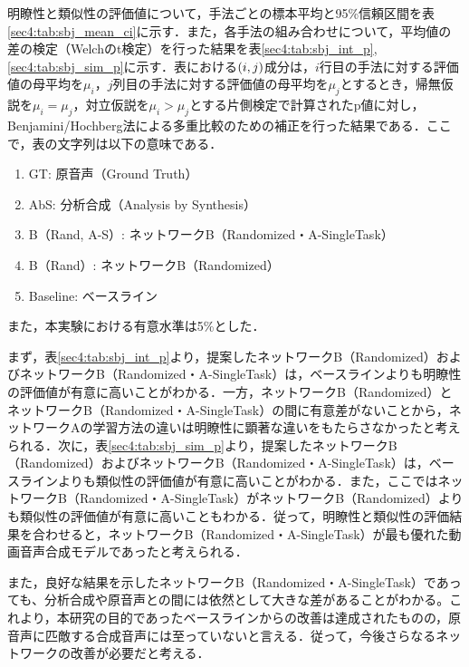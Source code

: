 明瞭性と類似性の評価値について，手法ごとの標本平均と95\%信頼区間を表\ref{sec4:tab:sbj_mean_ci}に示す．また，各手法の組み合わせについて，平均値の差の検定（Welchのt検定）を行った結果を表\ref{sec4:tab:sbj_int_p}, \ref{sec4:tab:sbj_sim_p}に示す．表における$\left(i, j\right)$成分は，$i$行目の手法に対する評価値の母平均を$\mu_{i}$，$j$列目の手法に対する評価値の母平均を$\mu_{j}$とするとき，帰無仮説を$\mu_{i} = \mu_{j}$，対立仮説を$\mu_{i} > \mu_{j}$とする片側検定で計算されたp値に対し，Benjamini/Hochberg法による多重比較のための補正を行った結果である．ここで，表の文字列は以下の意味である．
\begin{enumerate}
    \item GT: 原音声（Ground Truth）
    \item AbS: 分析合成（Analysis by Synthesis）
    \item B（Rand, A-S）: ネットワークB（Randomized・A-SingleTask）
    \item B（Rand）: ネットワークB（Randomized）
    \item Baseline: ベースライン
\end{enumerate}
また，本実験における有意水準は5\%とした．

まず，表\ref{sec4:tab:sbj_int_p}より，提案したネットワークB（Randomized）およびネットワークB（Randomized・A-SingleTask）は，ベースラインよりも明瞭性の評価値が有意に高いことがわかる．一方，ネットワークB（Randomized）とネットワークB（Randomized・A-SingleTask）の間に有意差がないことから，ネットワークAの学習方法の違いは明瞭性に顕著な違いをもたらさなかったと考えられる．次に，表\ref{sec4:tab:sbj_sim_p}より，提案したネットワークB（Randomized）およびネットワークB（Randomized・A-SingleTask）は，ベースラインよりも類似性の評価値が有意に高いことがわかる．また，ここではネットワークB（Randomized・A-SingleTask）がネットワークB（Randomized）よりも類似性の評価値が有意に高いこともわかる．従って，明瞭性と類似性の評価結果を合わせると，ネットワークB（Randomized・A-SingleTask）が最も優れた動画音声合成モデルであったと考えられる．

また，良好な結果を示したネットワークB（Randomized・A-SingleTask）であっても、分析合成や原音声との間には依然として大きな差があることがわかる。これより，本研究の目的であったベースラインからの改善は達成されたものの，原音声に匹敵する合成音声には至っていないと言える．従って，今後さらなるネットワークの改善が必要だと考える．

